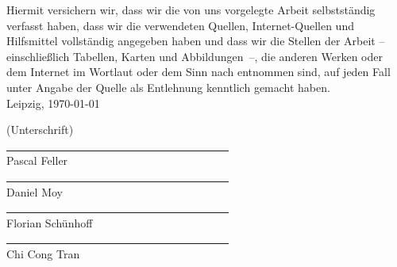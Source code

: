 \newpage
\pagestyle{empty}


\text{ }
\vspace{11.5cm}




Hiermit versichern wir, dass wir die von uns vorgelegte Arbeit selbstständig verfasst haben, dass wir die verwendeten Quellen, Internet-Quellen und Hilfsmittel vollständig angegeben haben und dass wir die Stellen der Arbeit -- einschließlich Tabellen, Karten und Abbildungen~--, die anderen Werken oder dem Internet im Wortlaut oder dem Sinn nach entnommen sind, auf jeden Fall unter Angabe der Quelle als Entlehnung kenntlich gemacht haben.\\

Leipzig, \today\\
\medskip
\medskip

(Unterschrift)\\
\underline{~~~~~~~~~~~~~~~~~~~~~~~~~~~~~~~~~~~~~~~~}\\
Pascal Feller\\
\underline{~~~~~~~~~~~~~~~~~~~~~~~~~~~~~~~~~~~~~~~~}\\
Daniel Moy\\
\underline{~~~~~~~~~~~~~~~~~~~~~~~~~~~~~~~~~~~~~~~~}\\
Florian Schünhoff\\
\underline{~~~~~~~~~~~~~~~~~~~~~~~~~~~~~~~~~~~~~~~~}\\
Chi Cong Tran\\

\newpage

